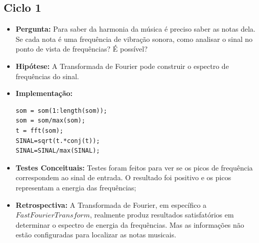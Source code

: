 \subsection{Ciclo 1}
\label{subsec:ciclo_1}

\begin{itemize}
\item \textbf{Pergunta:} Para saber da harmonia da música é preciso saber as notas dela. Se cada nota é uma frequência de vibração sonora, como analisar o sinal no ponto de vista de frequências? É possível?
\item \textbf{Hipótese:} A Transformada de Fourier pode construir o espectro de frequências do sinal.
\item \textbf{Implementação:} 
\begin{lstlisting}
som = som(1:length(som));
som = som/max(som);
t = fft(som);
SINAL=sqrt(t.*conj(t));
SINAL=SINAL/max(SINAL);
\end{lstlisting}
\item \textbf{Testes Conceituais:} Testes foram feitos para ver se os picos de frequência correspondem ao sinal de entrada. O resultado foi positivo e os picos representam a energia das frequências;
\item \textbf{Retrospectiva:} A Transformada de Fourier, em específico a $Fast Fourier Transform$, realmente produz resultados satisfatórios em determinar o espectro de energia da frequências. Mas as informações não estão configuradas para localizar as notas musicais.
\end{itemize}

